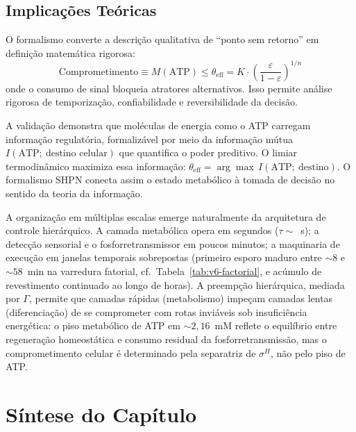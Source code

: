 \subsection{Implicações Teóricas}

O formalismo converte a descrição qualitativa de ``ponto sem retorno'' em
definição matemática rigorosa:
\begin{equation}
\text{Comprometimento} \equiv
M(\text{ATP}) \leq \theta_{\text{eff}} = K \cdot
\left(\frac{\varepsilon}{1 - \varepsilon}\right)^{1/n}
\end{equation}
onde o consumo de sinal bloqueia atratores alternativos.
Isso permite análise rigorosa de temporização, confiabilidade e reversibilidade
da decisão.

A validação demonstra que moléculas de energia como o ATP carregam informação
regulatória, formalizável por meio da informação mútua $I(\text{ATP};\
\text{destino celular})$ que quantifica o poder preditivo.
O limiar termodinâmico maximiza essa informação:
$\theta_{\text{eff}} = \arg\max\, I(\text{ATP};\ \text{destino})$.
O formalismo SHPN conecta assim o estado metabólico à tomada de decisão no
sentido da teoria da informação.

A organização em múltiplas escalas emerge naturalmente da arquitetura
de controle hierárquico.
A camada metabólica opera em segundos ($\tau \sim$~s); a detecção
sensorial e o fosforretransmissor em poucos minutos; a maquinaria de
execução em janelas temporais sobrepostas (primeiro esporo maduro
entre $\sim\!8$ e $\sim\!58$~min na varredura fatorial,
cf.\ Tabela~\ref{tab:v6-factorial}, e acúmulo de revestimento
continuado ao longo de horas).
A preempção hierárquica, mediada por $\Gamma$, permite que camadas
rápidas (metabolismo) impeçam camadas lentas (diferenciação) de se
comprometer com rotas inviáveis sob insuficiência energética: o piso
metabólico de ATP em $\sim\!2{,}16$~mM reflete o equilíbrio entre
regeneração homeostática e consumo residual da fosforretransmissão,
mas o comprometimento celular é determinado pela separatriz de $\sigma^H$,
não pelo piso de ATP.

\section{Síntese do Capítulo}
\label{sec:sintese-bacillus}

